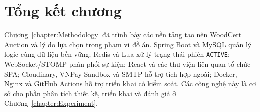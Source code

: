 \documentclass[../DoAn.tex]{subfiles}
\begin{document}
\section{Tổng kết chương}

Chương~\ref{chapter:Methodology} đã trình bày các nền tảng tạo nên WoodCert Auction và lý do lựa chọn trong phạm vi đồ án. Spring Boot và MySQL quản lý logic cùng dữ liệu bền vững; Redis và Lua xử lý trạng thái phiên \texttt{ACTIVE}; WebSocket/STOMP phân phối sự kiện; React và các thư viện liên quan tổ chức SPA; Cloudinary, VNPay Sandbox và SMTP hỗ trợ tích hợp ngoài; Docker, Nginx và GitHub Actions hỗ trợ triển khai có kiểm soát. Các công nghệ này là cơ sở cho phần phân tích thiết kế, triển khai và đánh giá ở Chương~\ref{chapter:Experiment}.

\FloatBarrier
\end{document}
